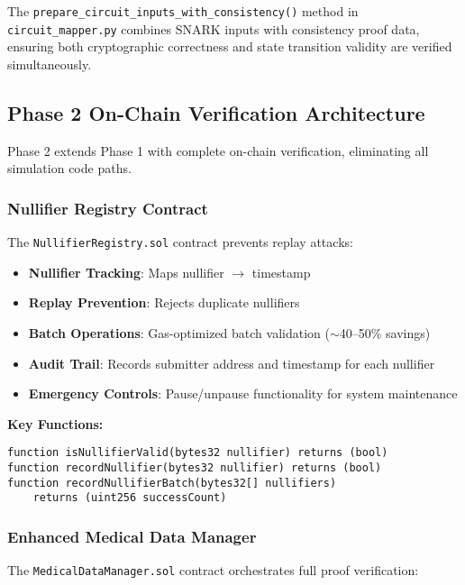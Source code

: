 The \texttt{prepare\_circuit\_inputs\_with\_consistency()} method in \texttt{circuit\_mapper.py} combines SNARK inputs with consistency proof data, ensuring both cryptographic correctness and state transition validity are verified simultaneously.

\subsection{Phase 2 On-Chain Verification Architecture}

Phase 2 extends Phase 1 with complete on-chain verification, eliminating all simulation code paths.

\subsubsection{Nullifier Registry Contract}

The \texttt{NullifierRegistry.sol} contract prevents replay attacks:

\begin{itemize}
    \item \textbf{Nullifier Tracking}: Maps nullifier $\rightarrow$ timestamp
    \item \textbf{Replay Prevention}: Rejects duplicate nullifiers
    \item \textbf{Batch Operations}: Gas-optimized batch validation ($\sim$40--50\% savings)
    \item \textbf{Audit Trail}: Records submitter address and timestamp for each nullifier
    \item \textbf{Emergency Controls}: Pause/unpause functionality for system maintenance
\end{itemize}

\textbf{Key Functions:}
\begin{verbatim}
function isNullifierValid(bytes32 nullifier) returns (bool)
function recordNullifier(bytes32 nullifier) returns (bool)
function recordNullifierBatch(bytes32[] nullifiers) 
    returns (uint256 successCount)
\end{verbatim}

\subsubsection{Enhanced Medical Data Manager}

The \texttt{MedicalDataManager.sol} contract orchestrates full proof verification:

